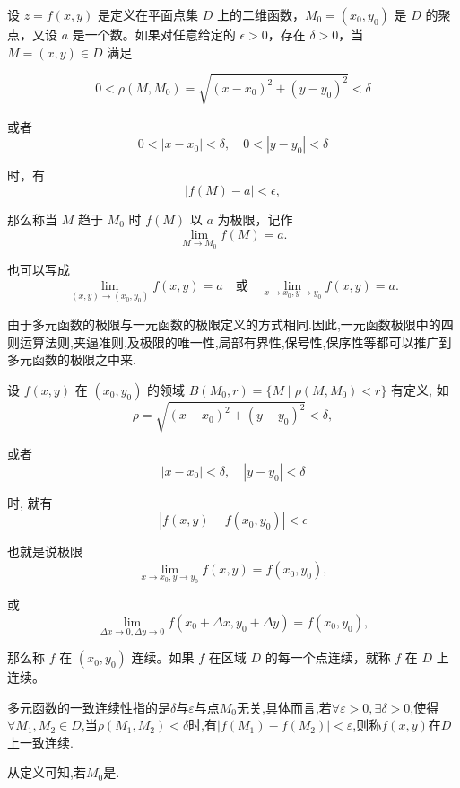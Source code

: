 \begin{definition}
    设 \( z = f(x, y) \) 是定义在平面点集 \( D \) 上的二维函数，\( M_0 = (x_0, y_0) \) 是 \( D \) 的聚点，又设 \( a \) 是一个数。如果对任意给定的 \( \epsilon > 0 \)，存在 \( \delta > 0 \)，当 \( M = (x, y) \in D \) 满足

$$
0 < \rho(M, M_0) = \sqrt{(x - x_0)^2 + (y - y_0)^2} < \delta
$$

或者
$$
0 < |x - x_0| < \delta, \quad 0 < |y - y_0| < \delta
$$

时，有
$$
|f(M) - a| < \epsilon,
$$

那么称当 \( M \) 趋于 \( M_0 \) 时 \( f(M) \) 以 \( a \) 为极限，记作
$$
\lim_{M \to M_0} f(M) = a.
$$

也可以写成
$$
\lim_{(x, y) \to (x_0, y_0)} f(x, y) = a \quad \text{或} \quad \lim_{x \to x_0 , y \to y_0} f(x, y) = a.
$$
\end{definition}

由于多元函数的极限与一元函数的极限定义的方式相同.因此,一元函数极限中的四则运算法则,夹逼准则,及极限的唯一性,局部有界性,保号性,保序性等都可以推广到多元函数的极限之中来.

\begin{definition}
    设 \( f(x, y) \) 在 \( (x_0, y_0) \) 的领域 \( B(M_0, r) = \{ M \mid \rho(M, M_0) < r \} \) 有定义, 如
$$
\rho = \sqrt{(x - x_0)^2 + (y - y_0)^2} < \delta,
$$

或者
$$
|x - x_0| < \delta, \quad |y - y_0| < \delta
$$

时, 就有
$$
|f(x, y) - f(x_0, y_0)| < \epsilon
$$

也就是说极限
$$
\lim_{x \to x_0, y \to y_0} f(x, y) = f(x_0, y_0),
$$

或
$$
\lim_{\Delta x \to 0, \Delta y \to 0} f(x_0 + \Delta x, y_0 + \Delta y) = f(x_0, y_0),
$$

那么称 \( f \) 在 \( (x_0, y_0) \) 连续。如果 \( f \) 在区域 \( D \) 的每一个点连续，就称 \( f \) 在 \( D \) 上连续。
\end{definition}

\begin{remark}
    多元函数的一致连续性指的是$\delta$与$\varepsilon$与点$M_0$无关,具体而言,若$\forall \varepsilon > 0, \exists \delta > 0$,使得$\forall M_1,M_2 \in D$,当$\rho(M_1,M_2) < \delta$时,有$|f(M_1)-f(M_2)| < \varepsilon$,则称$f(x,y)$在$D$上一致连续.
\end{remark}

从定义可知,若$M_0$是.



























